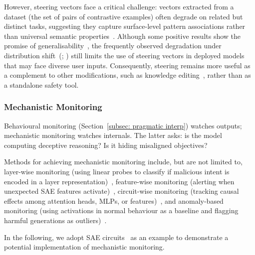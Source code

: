 However, steering vectors face a critical challenge: vectors extracted from a dataset (the set of pairs of contrastive examples) often degrade on related but distinct tasks, suggesting they capture surface-level pattern associations rather than universal semantic properties~. Although some positive results show the promise of generalisability~, the frequently observed degradation under distribution shift~(; ) still limits the use of steering vectors in deployed models that may face diverse user inputs. Consequently, steering remains more useful as a complement to other modifications, such as knowledge editing~, rather than as a standalone safety tool.

\subsubsection{Mechanistic Monitoring}
\label{subsubsec: mech monitor}
Behavioural monitoring (Section~\ref{subsec: pragmatic interp}) watches outputs; mechanistic monitoring watches internals. The latter asks: is the model computing deceptive reasoning? Is it hiding misaligned objectives? 

Methods for achieving mechanistic monitoring include, but are not limited to, layer-wise monitoring (using linear probes to classify if malicious intent is encoded in a layer representation)~, feature-wise monitoring (alerting when unexpected SAE features activate)~, circuit-wise monitoring (tracking causal effects among attention heads, MLPs, or features)~, and anomaly-based monitoring (using activations in normal behaviour
as a baseline and flagging harmful generations as outliers)~.

In the following, we adopt SAE circuits~ as an example to demonstrate a potential implementation of mechanistic monitoring.


